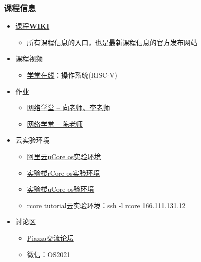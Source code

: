 \begin{frame}
    \frametitle{课程信息}
    \begin{itemize}
        \item \href{http://os.cs.tsinghua.edu.cn/oscourse/OS2021spring}{课程\textbf{WIKI}}
        \begin{itemize}
            \item 所有课程信息的入口，也是最新课程信息的官方发布网站
        \end{itemize}
        \item 课程视频
        \begin{itemize}
            \item \href{https://next.xuetangx.com/}{学堂在线}：操作系统(RISC-V)
        \end{itemize}
        \item 作业
        \begin{itemize}
            \item \href{https://learn.tsinghua.edu.cn/f/wlxt/kcgg/wlkc_ggb/teacher/beforePageListJs?wlkcid=2020-2021-2142100238}{网络学堂 -- 向老师、李老师}		
            \item \href{https://learn.tsinghua.edu.cn/f/wlxt/index/course/teacher/course?wlkcid=2020-2021-2142100239}{网络学堂 -- 陈老师}
        \end{itemize}
        \item 云实验环境
        \begin{itemize}
            \item \href{https://developer.aliyun.com/adc/series/labs-tsinghua-os/}{阿里云uCore os实验环境}
            \item \href{https://www.lanqiao.cn/courses/1481}{实验楼rCore os实验环境}
            \item \href{https://www.lanqiao.cn/courses/221}{实验楼uCore os验环境}
            \item rcore tutorial云实验环境：ssh -l rcore 166.111.131.12
        \end{itemize}
        \item 讨论区
        \begin{itemize}
            \item \href{https://piazza.com/tsinghua.edu.cn/spring2015/30240243x/home}{Piazza交流论坛}
            \item 微信：OS2021
        \end{itemize}
    \end{itemize}
\end{frame}
